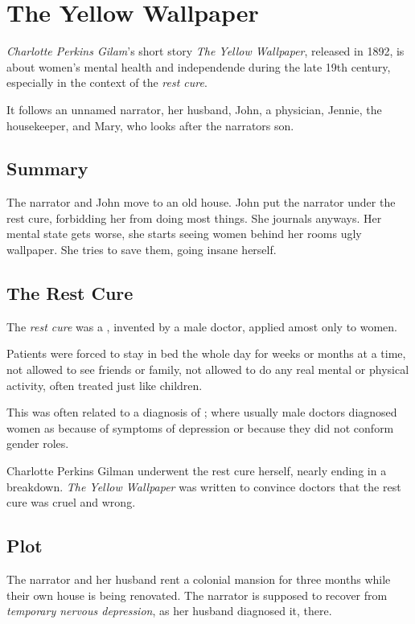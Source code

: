 \documentclass{article}
\begin{document}
\section{The Yellow Wallpaper}
\emph{Charlotte Perkins Gilam}'s short story \emph{The Yellow Wallpaper}, released in 1892, is about women's mental health and independende during the late 19th century, especially in the context of the \emph{rest cure}.
 
It follows an unnamed narrator, her husband, John, a physician, Jennie, the housekeeper, and Mary, who looks after the narrators son.
 
\subsection{Summary}
The narrator and John move to an old house. John put the narrator under the rest cure, forbidding her from doing most things. She journals anyways. Her mental state gets worse, she starts seeing women behind her rooms ugly wallpaper. She tries to save them, going insane herself.
 
\subsection{The Rest Cure}
The \emph{rest cure} was a , invented by a male doctor, applied amost only to women.
 
Patients were forced to stay in bed the whole day for weeks or months at a time, not allowed to see friends or family, not allowed to do any real mental or physical activity, often treated just like children.
 
This  was often related to a diagnosis of ; where usually male doctors diagnosed women as  because of symptoms of depression or because they did not conform gender roles.
 
Charlotte Perkins Gilman underwent the rest cure herself, nearly ending in a breakdown. \emph{The Yellow Wallpaper} was written to convince doctors that the rest cure was cruel and wrong. 
 
\subsection{Plot}
The narrator and her husband rent a colonial mansion for three months while their own house is being renovated. The narrator is supposed to recover from \emph{temporary nervous depression}, as her husband diagnosed it, there.
 
\end{document}

